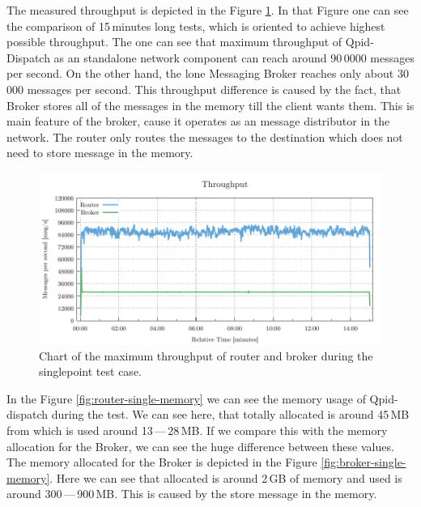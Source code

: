 The measured throughput is depicted in the Figure \ref{fig:rate-single}. In that Figure one can see the comparison of 15\,minutes long tests, which is oriented to achieve highest possible throughput. The one can see that maximum throughput of Qpid-Dispatch as an standalone network component can reach around 90\,0000 messages per second. On the other hand, the lone Messaging Broker reaches only about 30\,000 messages per second. This throughput difference is caused by the fact, that Broker stores all of the messages in the memory till the client wants them. This is main feature of the broker, cause it operates as an message distributor in the network. The router only routes the messages to the destination which does not need to store message in the memory.

\begin{figure}[H]
	\centering
	\includegraphics[width=1\linewidth]{obrazky-figures/charts/singlepoint-throughput.pdf}
	\caption{Chart of the maximum throughput of router and broker during the singlepoint test case.}
	\label{fig:rate-single}
\end{figure}

In the Figure \ref{fig:router-single-memory} we can see the memory usage of Qpid-dispatch during the test. We can see here, that totally allocated is around 45\,MB from which is used around 13\,---\,28\,MB. If we compare this with the memory allocation for the Broker, we can see the huge difference between these values. The memory allocated for the Broker is depicted in the Figure \ref{fig:broker-single-memory}. Here we can see that allocated is around 2\,GB of memory and used is around 300\,---\,900\,MB. This is caused by the store message in the memory.


